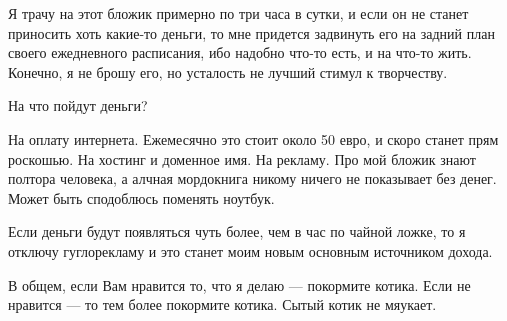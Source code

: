 \begin{multicols}{2}
Я трачу на этот бложик примерно по три часа в сутки, и если он не станет
приносить хоть какие-то деньги, то мне придется задвинуть его на задний план
своего ежедневного расписания, ибо надобно что-то есть, и на что-то жить.
Конечно, я не брошу его, но усталость не лучший стимул к творчеству.

На что пойдут деньги?

На оплату интернета. Ежемесячно это стоит около 50 евро, и скоро станет прям
роскошью. На хостинг и доменное имя. На рекламу. Про мой бложик знают полтора
человека, а алчная мордокнига никому ничего не показывает без денег. Может быть
сподоблюсь поменять ноутбук.

Если деньги будут появляться чуть более, чем в час по чайной ложке, то я
отключу гуглорекламу и это станет моим новым основным источником дохода.

В общем, если Вам нравится то, что я делаю — покормите котика. Если не нравится
— то тем более покормите котика. Сытый котик не мяукает.


\end{multicols} %
